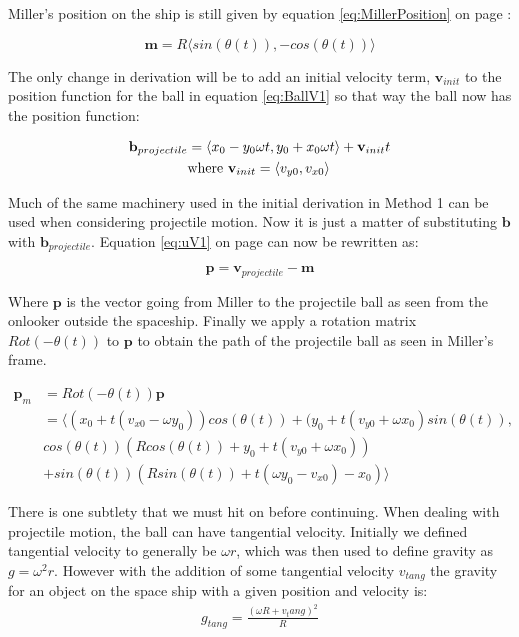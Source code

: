 \documentclass{amsart}
\renewcommand{\vec}{\textbf}
\theoremstyle{definition}
\begin{document}
Miller's position on the ship is still given by equation \ref{eq:MillerPosition} on page \pageref{eq:MillerPosition}:

\[\vec{m} = R\langle sin(\theta (t) ), - cos (\theta (t) ) \rangle\]

The only change in derivation will be to add an initial velocity term, $\vec{v}_{init}$ to the position function for the ball in equation \ref{eq:BallV1} so that way the ball now has the position function:

\begin{equation}\label{eq:BallProjectile}
\begin{split}
     \vec{b}_{projectile} &= \langle x_0 - y_0 \omega t, y_0 + x_0 \omega t \rangle + \vec{v}_{init}t \\ 
     &\textnormal{where } \vec{v}_{init} = \langle v_{y0},v_{x0} \rangle
\end{split}
\end{equation}

Much of the same machinery used in the initial derivation in Method 1 can be used when considering projectile motion. Now it is just a matter of substituting $\vec{b}$ with $\vec{b}_{projectile}$. Equation \ref{eq:uV1} on page \pageref{eq:uV1} can now be rewritten as:

\begin{equation}
    \vec{p} = \vec{v}_{projectile} - \vec{m}
\end{equation}

Where $\vec{p}$ is the vector going from Miller to the projectile ball as seen from the onlooker outside the spaceship. Finally we apply a rotation matrix $Rot(-\theta(t))$ to $\vec{p}$ to obtain the path of the projectile ball as seen in Miller's frame.

\begin{equation}\label{eq:ProjectileMillerFrame}
\begin{split}
    \vec{p}_m &= Rot(-\theta(t))\vec{p} \\
    &= \langle (x_0 + t(v_{x0} - \omega y_0)) cos(\theta(t)) + (y_0 +t(v_{y0} + \omega x_0) sin(\theta(t)),\\
    & cos(\theta(t)) (R cos(\theta(t)) + y_0 + t(v_{y0} + \omega x_0)) \\
    &+ sin(\theta(t))(R sin(\theta(t)) + t(\omega y_0 - v_{x0})-x_0) \rangle
\end{split}
\end{equation}

There is one subtlety that we must hit on before continuing. When dealing with projectile motion, the ball can have tangential velocity. Initially we defined tangential velocity to generally be $\omega r$, which was then used to define gravity as $g = \omega^2 r$.  However with the addition of some tangential velocity $v_{tang}$ the gravity for an object on the space ship with a given position and velocity is:
\begin{equation}\label{eq:TangentGravity}
\begin{split}
    g_{tang} = \frac{(\omega R + v_tang)^2}{R}
\end{split}
\end{equation}
\end{document}
